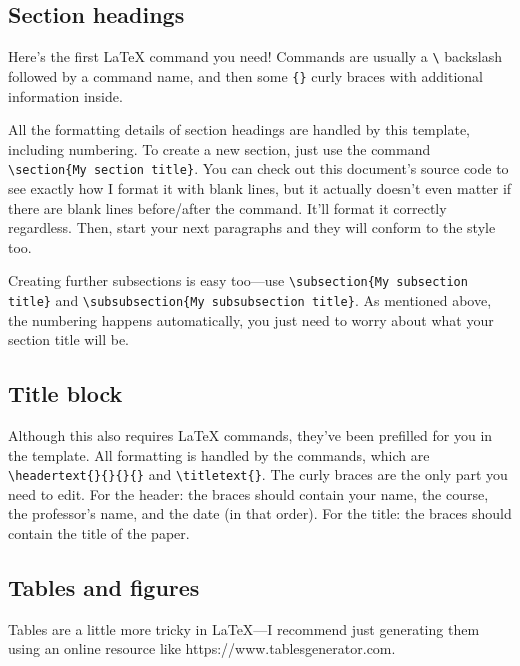 \documentclass[12pt]{article}
\newcommand{\titletext}[1]
{\begin{center}
		\textbf{#1}
\end{center}}
\newcommand{\headertext}[4]
{\begin{flushleft}
		#1
		\\ #2
		\\ #3
		\\ #4
\end{flushleft}}
\begin{document}
	\subsection{Section headings} 
	Here's the first LaTeX command you need! Commands are usually a \verb|\| backslash followed by a command name, and then some \verb|{}| curly braces with additional information inside. 
	
	All the formatting details of section headings are handled by this template, including numbering. To create a new section, just use the command \verb|\section{My section title}|. You can check out this document's source code to see exactly how I format it with blank lines, but it actually doesn't even matter if there are blank lines before/after the command. It'll format it correctly regardless. Then, start your next paragraphs and they will conform to the style too.
	
	Creating further subsections is easy too---use \verb|\subsection{My subsection title}| and \verb|\subsubsection{My subsubsection title}|. As mentioned above, the numbering happens automatically, you just need to worry about what your section title will be.
	
	\subsection{Title block}
	Although this also requires LaTeX commands, they've been prefilled for you in the template. All formatting is handled by the commands, which are \verb|\headertext{}{}{}{}| and \verb|\titletext{}|. The curly braces are the only part you need to edit. For the header: the braces should contain your name, the course, the professor's name, and the date (in that order). For the title: the braces should contain the title of the paper.
	
	\subsection{Tables and figures}
	Tables are a little more tricky in LaTeX---I recommend just generating them using an online resource like https://www.tablesgenerator.com.
	
\end{document}
